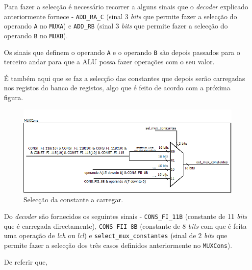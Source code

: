 \documentclass[11pt]{article}
\numberwithin{equation}{section}
\begin{document}
Para fazer a selecção é necessário recorrer a alguns sinais que o \textit{decoder} explicado anteriormente fornece - \texttt{ADD\_RA\_C} (sinal 3 \textit{bits} que permite fazer a selecção do operando \texttt{A} no \texttt{MUXA}) e \texttt{ADD\_RB} (sinal 3 \textit{bits} que permite fazer a selecção do operando \texttt{B} no \texttt{MUXB}). 

Os sinais que definem o operando \texttt{A} e o operando \texttt{B} são depois passados para o terceiro andar para que a ALU possa fazer operações com o seu valor.

É também aqui que se faz a selecção das constantes que depois serão carregadas nos registos do banco de registos, algo que é feito de acordo com a próxima figura.

\vspace{-2.1mm}

\begin{figure}[H]
	\centering
	\includegraphics[keepaspectratio=true, scale=0.55]{imagens/OF2}
	\caption{Selecção da constante a carregar.}
	\vspace{-0.8em}
\end{figure}

Do \textit{decoder} são fornecidos os seguintes sinais - \texttt{CONS\_FI\_11B} (constante de 11 \textit{bits} que é carregada directamente), \texttt{CONS\_FII\_8B} (constante de 8 \textit{bits} com que é feita uma operação de \textit{lch} ou \textit{lcl}) e \texttt{select\_mux\_constantes}  (sinal de 2 \textit{bits} que permite fazer a selecção dos três casos definidos anteriormente no \texttt{MUXCons}).

De referir que, 
\end{document}
